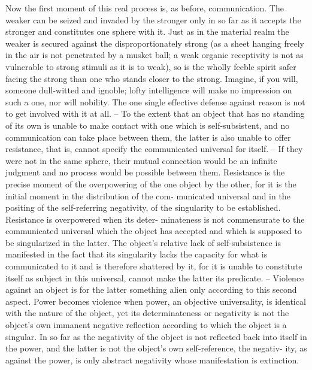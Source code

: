 Now the first moment of this real process is, as before, communication.
The weaker can be seized and invaded by the stronger only in so far as
it accepts the stronger and constitutes one sphere with it. Just as in the
material realm the weaker is secured against the disproportionately strong
(as a sheet hanging freely in the air is not penetrated by a musket ball; a
weak organic receptivity is not as vulnerable to strong stimuli as it is to
weak), so is the wholly feeble spirit safer facing the strong than one who
stands closer to the strong. Imagine, if you will, someone dull-witted and
ignoble; lofty intelligence will make no impression on such a one, nor
will nobility. The one single effective defense against reason is not to get
involved with it at all. – To the extent that an object that has no standing
of its own is unable to make contact with one which is self-subsistent, and
no communication can take place between them, the latter is also unable
to offer resistance, that is, cannot specify the communicated universal for
itself. – If they were not in the same sphere, their mutual connection would
be an infinite judgment and no process would be possible between them.
Resistance is the precise moment of the overpowering of the one object
by the other, for it is the initial moment in the distribution of the com-
municated universal and in the positing of the self-referring negativity, of
the singularity to be established. Resistance is overpowered when its deter-
minateness is not commensurate to the communicated universal which the
object has accepted and which is supposed to be singularized in the latter.
The object's relative lack of self-subsistence is manifested in the fact that its
singularity lacks the capacity for what is communicated to it and is therefore
shattered by it, for it is unable to constitute itself as subject in this universal,
cannot make the latter its predicate. – Violence against an object is for the
latter something alien only according to this second aspect. Power becomes
violence when power, an objective universality, is identical with the nature
of the object, yet its determinateness or negativity is not the object's own
immanent negative reflection according to which the object is a singular.
In so far as the negativity of the object is not reflected back into itself in
the power, and the latter is not the object's own self-reference, the negativ-
ity, as against the power, is only abstract negativity whose manifestation is
extinction.

